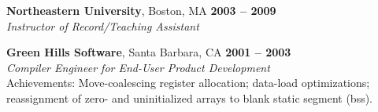 \documentclass[margin,line,draft]{res}
\def\noneed#1{}
\def\coursetitle#1{\textsl{#1}}
\def\coursenum#1{#1}
\def\course#1#2{\coursenum{#1} \coursetitle{#2}}
\begin{document}
\begin{resume}
\newpage

    \textbf{Northeastern University}, Boston, MA \hfill \textbf{2003 -- 2009}\\\vspace{1mm}%
    \textsl{Instructor of Record/Teaching Assistant}

    \textbf{Green Hills Software}, Santa Barbara, CA \hfill \textbf{2001 -- 2003}\\\vspace{1mm}%
    \textsl{Compiler Engineer for End-User Product Development}
    \\
    Achievements: Move-coalescing register allocation; data-load optimizations; reassignment of zero- and uninitialized arrays to blank static segment (bss).
%
% 
% 
% 

\noneed{
    \textbf{ESP High School Studies Program}, Cambridge, MA \vspace{2mm}\\\vspace{1mm}%
    \textsl{Instructor} \hfill \textbf{2001 -- 2001}\\
    Volunteer Instructor M-20A: \coursetitle{Square Peg Solutions}
    \noneed{Problem Solving via Decomposition, Visualization, and Abstraction}
}


\end{resume}
\end{document}
